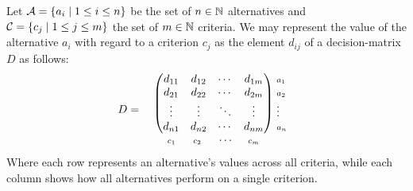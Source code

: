 \begin{definition} 
    Let $\mathcal{A} =\{a_i\mid 1\leq i \leq n\} $ be the set of $n\in \mathbb{N}$ alternatives and $\mathcal{C} =\{c_j\mid 1\leq j \leq m\}$ the set of $m \in \mathbb{N}$ criteria. We may represent the value of the alternative $a_i$ with regard to a criterion $c_j$ as the element $d_{ij}$ of a decision-matrix $D$ as follows:
    \[D=
\setlength{\arraycolsep}{5pt} %
\begin{array}{c@{\,}l}
  \begin{array}{c}
    \begin{pmatrix}
      d_{11} & d_{12} & \cdots & d_{1m} \\
      d_{21} & d_{22} & \cdots & d_{2m} \\
      \vdots & \vdots & \ddots & \vdots \\
      d_{n1} & d_{n2} & \cdots & d_{nm}
    \end{pmatrix} \\[2mm] %
    \begin{array}{llll}
      \scriptstyle c_1 \hspace{1mm}& \hspace{1mm}\scriptstyle c_2 \hspace{1mm} & \hspace{1mm}\cdots  &   \hspace{1mm}\scriptstyle c_m
    \end{array}
  \end{array}
  \hspace{-2.5mm}
  \begin{array}{l}
    \scriptstyle a_1 \\%
    \scriptstyle a_2 \\%
    \scriptstyle \vdots \\%
    \scriptstyle a_n\\
    \\
  \end{array}
\end{array}
\]
Where each row represents an alternative's values across all criteria, while each column shows how all alternatives perform on a single criterion.
    
\end{definition}



